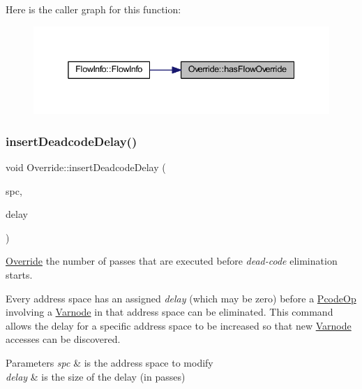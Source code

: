 Here is the caller graph for this function\+:
\nopagebreak
\begin{figure}[H]
\begin{center}
\leavevmode
\includegraphics[width=338pt]{class_override_aea606077c566aa82541128919c4ba5e2_icgraph}
\end{center}
\end{figure}
\mbox{\label{class_override_a2e55dd5f8157f3f7660c863eb7d036f9}} 
\subsubsection{\texorpdfstring{insertDeadcodeDelay()}{insertDeadcodeDelay()}}
{\footnotesize\ttfamily void Override\+::insert\+Deadcode\+Delay (\begin{DoxyParamCaption}\item[{\mbox{\hyperlink{class_addr_space}{Addr\+Space}} $\ast$}]{spc,  }\item[{int4}]{delay }\end{DoxyParamCaption})}



\mbox{\hyperlink{class_override}{Override}} the number of passes that are executed before {\itshape dead-\/code} elimination starts. 

Every address space has an assigned {\itshape delay} (which may be zero) before a \mbox{\hyperlink{class_pcode_op}{Pcode\+Op}} involving a \mbox{\hyperlink{class_varnode}{Varnode}} in that address space can be eliminated. This command allows the delay for a specific address space to be increased so that new \mbox{\hyperlink{class_varnode}{Varnode}} accesses can be discovered. 
\begin{DoxyParams}{Parameters}
{\em spc} & is the address space to modify \\
\hline
{\em delay} & is the size of the delay (in passes) \\
\hline
\end{DoxyParams}


